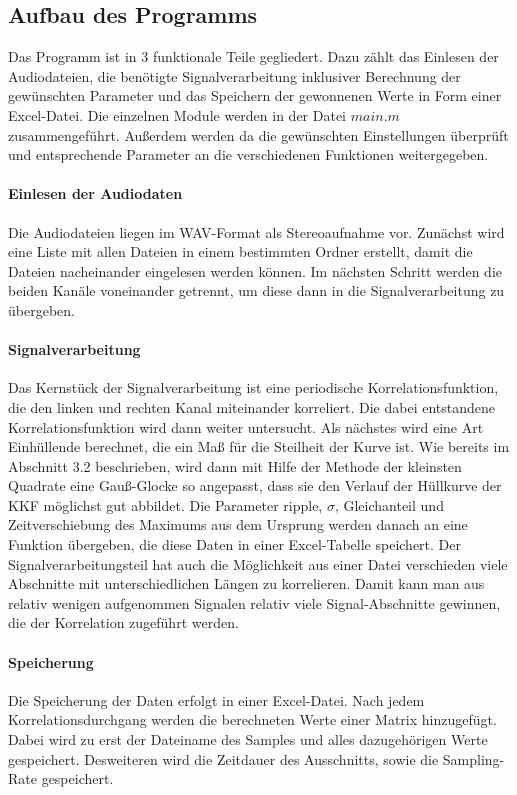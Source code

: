 \subsection{Aufbau des Programms}
Das Programm ist in 3 funktionale Teile gegliedert. Dazu zählt das Einlesen der Audiodateien, die benötigte Signalverarbeitung inklusiver Berechnung der gewünschten Parameter und das Speichern der gewonnenen Werte in Form einer Excel-Datei. Die einzelnen Module werden in der Datei $main.m$ zusammengeführt. Außerdem werden da die gewünschten Einstellungen überprüft und entsprechende Parameter an die verschiedenen Funktionen weitergegeben.
\paragraph{Einlesen der Audiodaten}
Die Audiodateien liegen im WAV-Format als Stereoaufnahme vor. Zunächst wird eine Liste mit allen Dateien in einem bestimmten Ordner erstellt, damit die Dateien nacheinander eingelesen werden können. Im nächsten Schritt werden die beiden Kanäle voneinander getrennt, um diese dann in die Signalverarbeitung zu übergeben.
\paragraph{Signalverarbeitung}
Das Kernstück der Signalverarbeitung ist eine periodische Korrelationsfunktion, die den linken und rechten Kanal miteinander korreliert. Die dabei entstandene Korrelationsfunktion wird dann weiter untersucht. Als nächstes wird eine Art Einhüllende berechnet, die ein Maß für die Steilheit der Kurve ist. Wie bereits im Abschnitt 3.2 beschrieben, wird dann mit Hilfe der Methode der kleinsten Quadrate eine Gauß-Glocke so angepasst, dass sie den Verlauf der Hüllkurve der KKF möglichst gut abbildet. Die Parameter ripple, $\sigma$, Gleichanteil und Zeitverschiebung des Maximums aus dem Ursprung werden danach an eine Funktion übergeben, die diese Daten in einer Excel-Tabelle speichert.
Der Signalverarbeitungsteil hat auch die Möglichkeit aus einer Datei verschieden viele Abschnitte mit unterschiedlichen Längen zu korrelieren. Damit kann man aus relativ wenigen aufgenommen Signalen relativ viele Signal-Abschnitte gewinnen, die der Korrelation zugeführt werden.
\paragraph{Speicherung}
Die Speicherung der Daten erfolgt in einer Excel-Datei. Nach jedem Korrelationsdurchgang werden die berechneten Werte einer Matrix hinzugefügt. Dabei wird zu erst der Dateiname des Samples und alles dazugehörigen Werte gespeichert. Desweiteren wird die Zeitdauer des Ausschnitts, sowie die Sampling-Rate gespeichert.

